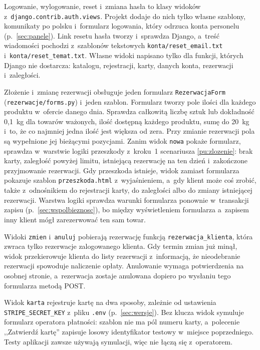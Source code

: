 \documentclass[12pt,a4paper,oneside]{article}
\newcounter{pu}
\begin{document}
Logowanie, wylogowanie, reset i~zmiana hasła to klasy widoków z~\texttt{django.contrib.\allowbreak{}auth.views}. Projekt dodaje do nich tylko własne szablony, komunikaty po polsku i~formularz logowania, który odrzuca konta personelu (p.~\ref{sec:panele}). Link resetu hasła tworzy i~sprawdza Django, a~treść wiadomości pochodzi z~szablonów tekstowych \texttt{konta/reset\_email.txt} i~\texttt{konta/reset\_temat.txt}. Własne widoki napisano tylko dla funkcji, których Django nie dostarcza: katalogu, rejestracji, karty, danych konta, rezerwacji i~zaległości.

Złożenie i~zmianę rezerwacji obsługuje jeden formularz \texttt{RezerwacjaForm} (\texttt{rezerwacje/\allowbreak{}forms.py}) i~jeden szablon. Formularz tworzy pole ilości dla każdego produktu w~ofercie danego dnia. Sprawdza całkowitą liczbę sztuk lub dokładność 0,1~kg dla towarów ważonych, ilość dostępną każdego produktu, sumę do 20~kg i~to, że co najmniej jedna ilość jest większa od zera. Przy zmianie rezerwacji pola są wypełnione jej bieżącymi pozycjami. Zanim widok \texttt{nowa} pokaże formularz, sprawdza w~warstwie logiki przeszkody z~kroku~1 scenariusza \ref{pu:zlozenie}: brak karty, zaległość powyżej limitu, istniejącą rezerwację na ten dzień i~zakończone przyjmowanie rezerwacji. Gdy przeszkoda istnieje, widok zamiast formularza pokazuje szablon \texttt{przeszkoda.html} z~wyjaśnieniem, a~gdy klient może coś zrobić, także z~odnośnikiem do rejestracji karty, do zaległości albo do zmiany istniejącej rezerwacji. Warstwa logiki sprawdza warunki formularza ponownie w~transakcji zapisu (p.~\ref{sec:wspolbieznosc}), bo między wyświetleniem formularza a~zapisem inny klient mógł zarezerwować ten sam towar.

Widoki \texttt{zmien} i~\texttt{anuluj} pobierają rezerwację funkcją \texttt{rezerwacja\_klienta}, która zwraca tylko rezerwacje zalogowanego klienta. Gdy termin zmian już minął, widok przekierowuje klienta do listy rezerwacji z~informacją, że nieodebranie rezerwacji spowoduje naliczenie opłaty. Anulowanie wymaga potwierdzenia na osobnej stronie, a~rezerwacja zostaje anulowana dopiero po wysłaniu tego formularza metodą POST.

Widok \texttt{karta} rejestruje kartę na dwa sposoby, zależnie od ustawienia \texttt{STRIPE\_\allowbreak{}SECRET\_\allowbreak{}KEY} z~pliku \texttt{.env} (p.~\ref{sec:wersje}). Bez klucza widok symuluje formularz operatora płatności: szablon nie ma pól numeru karty, a~polecenie ,,Zatwierdź kartę'' zapisuje losowy identyfikator testowy w~miejsce poprzedniego. Testy aplikacji zawsze używają symulacji, więc nie łączą się z~operatorem.
\end{document}
